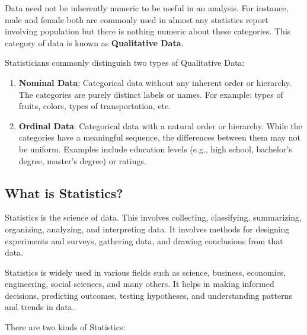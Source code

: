 \documentclass{article}
\begin{document}
            \noindent Data need not be inherently numeric to be useful in an analysis. For instance, male and female both are commonly used in almost any statistics report involving population but there is nothing numeric about these categories. This category of data is known as \textbf{Qualitative Data}.
            \bigskip
        
            \noindent Statisticians commonly distinguish two types of Qualitative Data:
            \begin{enumerate}
                \item \textbf{Nominal Data}: Categorical data without any inherent order or hierarchy. The categories are purely distinct labels or names. For example: types of fruits, colors, types of transportation, etc.
                
                \item \textbf{Ordinal Data}: Categorical data with a natural order or hierarchy. While the categories have a meaningful sequence, the differences between them may not be uniform. Examples include education  levels (e.g., high school, bachelor's degree, master's degree) or ratings.
                
            \end{enumerate}
            
        \subsection{What is Statistics?}

        Statistics is the science of data. This involves collecting, classifying, summarizing, organizing, analyzing, and interpreting data. It involves methods for designing experiments and surveys, gathering data, and drawing conclusions from that data.  

        \noindent Statistics is widely used in various fields such as science, business, economics, engineering, social sciences, and many others. It helps in making informed decisions, predicting outcomes, testing hypotheses, and understanding patterns and trends in data.

        \noindent There are two kinds of Statistics:
\end{document}
